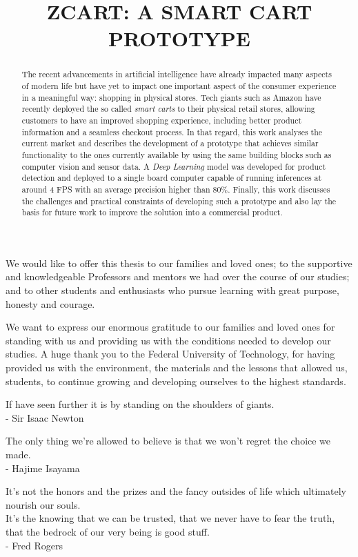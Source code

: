 \documentclass[openright]{normas-utf-tex} %
\title{\MakeUppercase{zCart: A smart cart prototype}} %
\begin{document}
\capa %
\folhaderosto %

\begin{dedicatoria}
We would like to offer this thesis to our families and loved ones;
to the supportive and knowledgeable Professors and mentors we had
over the course of our studies; and to other students and enthusiasts
who pursue learning with great purpose, honesty and courage.
\end{dedicatoria}

\begin{agradecimentos}
We want to express our enormous gratitude to our families and loved ones 
for standing with us and providing us with the conditions needed to develop our studies.
A huge thank you to the Federal University of Technology, for having
provided us with the environment, the materials and the lessons	that allowed us,
students, to continue growing and developing ourselves to the highest standards.
\end{agradecimentos}

\begin{epigrafe}
 If have seen further it is by standing on the shoulders of giants.  \\
- Sir Isaac Newton

 The only thing we're allowed to believe is that we won't regret the choice we made.  \\
- Hajime Isayama

It's not the honors and the prizes and the fancy outsides of life which ultimately nourish our souls. \\
It's the knowing that we can be trusted, that we never have to fear the truth, that the bedrock of our very being is good stuff.\\
- Fred Rogers
\end{epigrafe}

\begin{abstract}
The recent advancements in artificial intelligence have already impacted many
aspects of modern life but have yet to impact one important aspect of the
consumer experience in a meaningful way: shopping in physical stores. Tech
giants such as Amazon have recently deployed the so called \textit{smart
carts} to their physical retail stores, allowing customers to have an
improved shopping experience, including better product information and a
seamless checkout process. In that regard, this work analyses the current
market and describes the development of a prototype that achieves similar
functionality to the ones currently available by using the same building
blocks such as computer vision and sensor data. A \textit{Deep Learning}
model was developed for product detection and deployed to a single board
computer capable of running inferences at around 4 FPS with an average
precision higher than  80\%. Finally, this work discusses the challenges and
practical constraints of developing such a prototype and also lay the basis
for future work to improve the solution into a commercial product.
\end{abstract}
\end{document}
